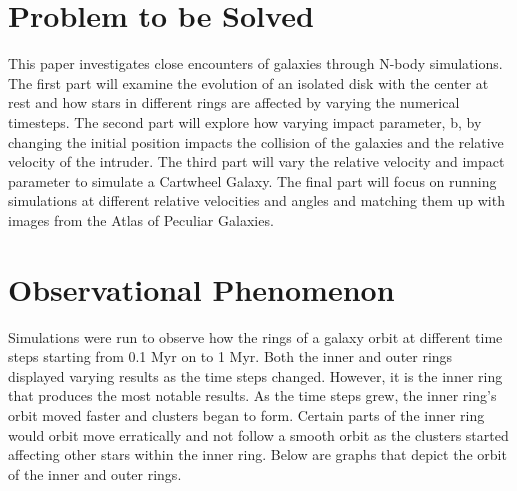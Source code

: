 \documentclass[linenumbers,RNAAS,trackchanges]{aastex631}
\begin{document}
 
\section{Problem to be Solved}\label{sec: prob}
This paper investigates close encounters of galaxies through N-body simulations. The first part will examine the evolution of an isolated disk with the center at rest and how stars in different rings are affected by varying the numerical timesteps. The second part will explore how varying impact parameter, b, by changing the initial position impacts the collision of the galaxies and the relative velocity of the intruder. The third part will vary the relative velocity and impact parameter to simulate a Cartwheel Galaxy. The final part will focus on running simulations at different relative velocities and angles and matching them up with images from the Atlas of Peculiar Galaxies.


\section{Observational Phenomenon} \label{sec:problem}
Simulations were run to observe how the rings of a galaxy orbit at different time steps starting from 0.1 Myr on to 1 Myr. Both the inner and outer rings displayed varying results as the time steps changed. However, it is the inner ring that produces the most notable results. As the time steps grew, the inner ring's orbit moved faster and clusters began to form. Certain parts of the inner ring would orbit move erratically and not follow a smooth orbit as the clusters started affecting other stars within the inner ring. Below are graphs that depict the orbit of the inner and outer rings. 
\end{document}
